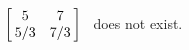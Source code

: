 {$\left[\hskip -3pt \begin{array}{cc} 5&7\\  5/3& 7/3\end {array} \hskip -3pt
 \right] $
 }
{\ttai\ does not exist.}
